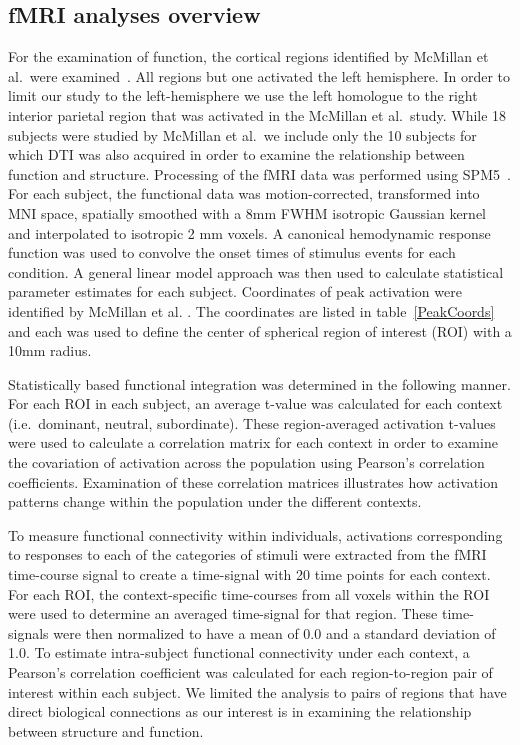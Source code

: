 \documentclass[final,authoryear,5p,times,twocolumn]{elsarticle}
\begin{document}
\subsection{fMRI analyses overview}
For the examination of function, the cortical regions identified by McMillan et al.\ were examined~\citep{McMillan2010}. All regions but one activated the left hemisphere. In order to limit our study to the left-hemisphere we use the left homologue to the right interior parietal region that was activated in the McMillan et al.\ study. While 18 subjects were studied by McMillan et al.\, we include only the 10 subjects for which DTI was also acquired in order to examine the relationship between function and structure. Processing of the fMRI data was performed using SPM5~\citep{SPM5}. For each subject, the functional data was motion-corrected, transformed into MNI space, spatially smoothed with a 8mm FWHM isotropic Gaussian kernel and interpolated to isotropic 2 mm voxels. A canonical hemodynamic response function was used to convolve the onset times of stimulus events for each condition. A general linear model approach was then used to calculate statistical parameter estimates for each subject. Coordinates of peak activation were identified by McMillan et al. \citep{McMillan2010}. The coordinates are listed in table~\ref{PeakCoords} and each was used to define the center of spherical region of interest (ROI) with a 10mm radius. 

Statistically based functional integration was determined in the following manner. For each ROI in each subject, an average t-value was calculated for each context (i.e.\ dominant, neutral, subordinate). These region-averaged activation t-values were used to calculate a correlation matrix for each context in order to examine the covariation of activation across the population using Pearson's correlation coefficients. Examination of these correlation matrices illustrates how activation patterns change within the population under the different contexts.

To measure functional connectivity within individuals, activations corresponding to responses to each of the categories of stimuli were extracted from the fMRI time-course signal to create a time-signal with 20 time points for each context. For each ROI, the context-specific time-courses from all voxels within the ROI were used to determine an averaged time-signal for that region. These time-signals were then normalized to have a mean of 0.0 and a standard deviation of 1.0. To estimate intra-subject functional connectivity under each context, a Pearson's correlation coefficient was calculated for each region-to-region pair of interest within each subject. We limited the analysis to pairs of regions that have direct biological connections as our interest is in examining the relationship between structure and function.
\end{document}
